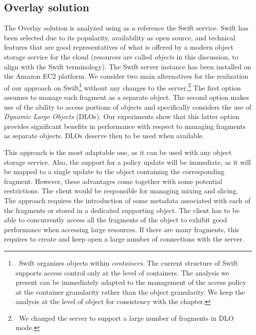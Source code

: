 \subsection{Overlay solution \label{ms:sec:overlay}}
The Overlay solution is analyzed using as a reference the Swift service. Swift has been selected due to its popularity, availability as open source, and technical features that are good representatives of what is offered by a modern object storage service for the cloud (resources are called {\em objects} in this discussion, to align with the Swift terminology). The Swift server instance has been installed on the Amazon EC2 platform. We consider two main alternatives for the realization of our approach on Swift\footnote{\ Swift organizes objects within {\em containers}. The current structure of Swift supports access control only at the level of containers. The analysis we present can be immediately adapted to the management of the access policy at the container granularity rather than the object granularity. We keep the analysis at the level of object for consistency with the chapter.} without any changes to the server.\footnote{\ We changed the server to support a large number of fragments in DLO mode.} The first option assumes to manage each fragment as a separate object. The second option makes use of the ability to access portions of objects and specifically considers the use of {\em Dynamic Large Objects} (DLOs). Our experiments show that this latter option provides significant benefits in performance with respect to managing fragments as separate objects. DLOs deserve then to be used when available.

\medskip
{} This approach is the most adaptable one, as it can be used with any object storage service. Also, the support for a policy update will be immediate, as it will be mapped to a single update to the object containing the corresponding fragment. However, these advantages come together with some potential restrictions. The client would be responsible for managing mixing and slicing. The approach requires the introduction of some metadata associated with each of the fragments or stored in a dedicated supporting object. The client has to be able to concurrently access all the fragments of the object to exhibit good performance when accessing large resources. If there are many fragments, this requires to create and keep open a large number of connections with the server.

